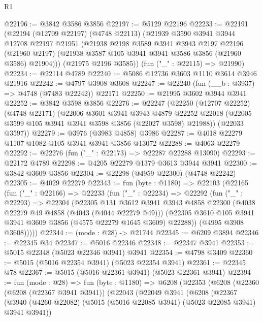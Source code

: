 \begin{lexlean}{R1}
\begin{coremodule}
@22196 := @3842 @3586 @3856
@22197 := @5129 @22196
@22233 := @22191
    (@22194
      (@12709 @22197)
      (@4748 @22113)
      (@21939
        @3590
        @3941
        @3944
        @12708
        @22197
        @21951
        (@21938
          @2198
          @3589
          @3941
          @3943
          @2197
          @22196
          (@21960 @2197)
          (@21938 @3587 @105 @3941 @3941 @3586 @3856 (@21960 @3586) @21904)))
      (@21975 @2196 @3585))
    (fun ("_" : @22115) => @21990)
@22234 := @22114 @4789
@22240 := @5086 @12736 @3603 @1110 @3614 @3946 @21916
@22242 := @4797 @3908 @3608
@22247 := @22240 (fun (__b : @3937) => @4748 (@7483 @22242)) @22171
@22250 := @21995 @3602 @3944 @3941
@22252 := @3842 @3598 @3856
@22276 := @22247
    (@22250
      (@12707 @22252)
      (@4748 @22171)
      (@22006
        @3601
        @3941
        @3943
        @4879
        @22252
        @22018
        (@22005 @3599 @105 @3941 @3941 @3598 @3856 (@22027 @3598) @21988))
      (@22033 @3597))
@22279 := @3976 (@3983 @4858) @3986
@22287 := @4018 @22279 @1107 @1082 @105 @3941 @3941 @3856 @13072
@22288 := @4063 @22279
@22292 := @22276 (fun ("_" : @22173) => @22287 @22288 @13090)
@22293 := @22172 @4789
@22298 := @4205 @22279 @1379 @3613 @3944 @3941
@22300 := @3842 @3609 @3856
@22304 := @22298 (@4959 @22300) (@4748 @22242)
@22305 := @4029 @22279
@22343 := fun (byte : @1180) =>
  @22103
    (@22165
      (fun ("_" : @22166) =>
      @22233
        (fun ("_" : @22234) =>
        @22292
          (fun ("_" : @22293) =>
          @22304
            (@22305
              @131
              @3612
              @3941
              @3943
              @4858
              @22300
              (@4038 @22279 @49 @4858 (@4043 (@4044 @22279 @49)))
              (@22305 @3610 @105 @3941 @3941 @3609 @3856 (@4575 @22279 @1645 @3609) @22288))
            (@4995 @3908 @3608)))))
@22344 := (mode : @28) -> @21744
@22345 := @6209 @3894
@22346 := @22345 @34
@22347 := @5016 @22346
@22348 := @22347 @3941
@22353 := @5015 @22348 (@5023 @22346 @3941) @3941
@22354 := @4798 @3409
@22360 := @5015 (@5016 @22354 @3941) (@5023 @22354 @3941)
@22361 := @22345 @78
@22367 := @5015 (@5016 @22361 @3941) (@5023 @22361 @3941)
@22394 := fun (mode : @28) =>
  fun (byte : @1180) =>
  @6208
    (@22353
      (@6208
        (@22360
          (@6208 (@22367 @3941 @3941))
          (@22043
            (@22049
              @3941
              (@6208
                (@22367
                  (@3940
                    (@4260 @22082)
                    (@5015 (@5016 @22085 @3941) (@5023 @22085 @3941) @3941 @3941))

\end{coremodule}
\end{lexlean}
